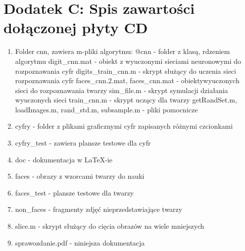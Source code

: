 \documentclass[11pt,a4paper]{article}
\begin{document}
\section{Dodatek C: Spis zawartości dołączonej płyty CD}
\begin{enumerate}
\item Folder cnn, zawiera m-pliki algorytmu:
\subitem @cnn - folder z klasą, rdzeniem algorytmu
\subitem digit\_cnn.mat - obiekt z wyuczonymi sieciami neuronowymi do rozpoznawania cyfr
\subitem digits\_train\_cnn.m - skrypt służący do uczenia sieci rozpoznawania cyfr
\subitem faces\_cnn.2.mat, faces\_cnn.mat - obiektywyuczonych sieci do rozpoznawania twarzy
\subitem sim\_file.m - skrypt symulacji działania wyuczonych sieci
\subitem train\_cnn.m - skrypt uczący dla twarzy
\subitem getRandSet.m, loadImages.m, rand\_std.m, subsample.m - pliki pomocnicze
\item cyfry - folder z plikami graficznymi cyfr zapisanych różnymi czcionkami
\item cyfry\_test - zawiera plansze testowe dla cyfr
\item doc - dokumentacja w \LaTeX-ie
\item faces - obrazy z wzorcami twarzy do nauki
\item faces\_test - plansze testowe dla twarzy
\item non\_faces - fragmenty zdjęć nieprzedstawiające twarzy
\item slice.m - skrypt służący do cięcia obrazów na wiele mniejszych
\item sprawozdanie.pdf - niniejsza dokumentacja
\end{enumerate}
\end{document}
